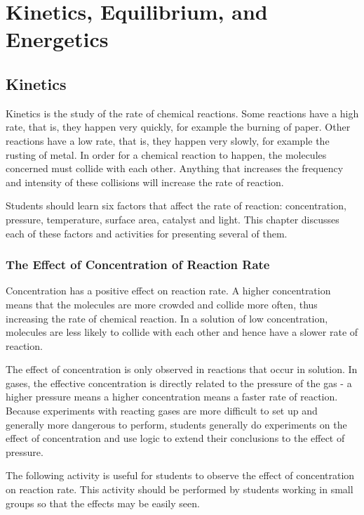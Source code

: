 \chapter{Kinetics, Equilibrium, and Energetics}

\section{Kinetics}

Kinetics is the study of the rate of chemical reactions. Some reactions have a high rate, that is, they happen very quickly, for example the burning of paper. Other reactions have a low rate, that is, they happen very slowly, for example the rusting of metal. In order for a chemical reaction to happen, the molecules concerned must collide with each other. Anything that increases the frequency and intensity of these collisions will increase the rate of reaction.

Students should learn six factors that affect the rate of reaction: concentration, pressure, temperature, surface area, catalyst and light. This chapter discusses each of these factors and activities for presenting several of them.

\subsection{The Effect of Concentration of Reaction Rate}

Concentration has a positive effect on reaction rate. A higher concentration means that the molecules are more crowded and collide more often, thus increasing the rate of chemical reaction. In a solution of low concentration, molecules are less likely to collide with each other and hence have a slower rate of reaction. 

The effect of concentration is only observed in reactions that occur in solution. In gases, the effective concentration is directly related to the pressure of the gas - a higher pressure means a higher concentration means a faster rate of reaction. Because experiments with reacting gases are more difficult to set up and generally more dangerous to perform, students generally do experiments on the effect of concentration and use logic to extend their conclusions to the effect of pressure.

The following activity is useful for students to observe the effect of concentration on reaction rate. This activity should be performed by students working in small groups so that the effects may be easily seen.

